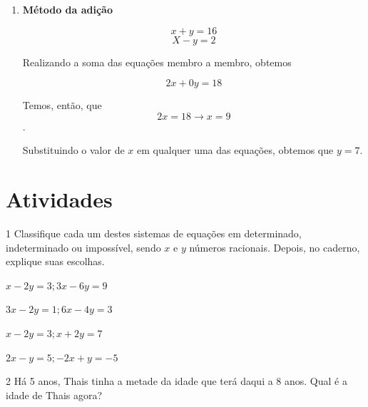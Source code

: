 {\begin{enumerate}
Agora, substituiremos o valor de $x$ na segunda equação:

II) $$2x + 3y = 10$$
    $$2 ( y -- 5) + 3y = 10$$
    $$2y - 10 + 3y = 10$$
    $$5y = 20$$
    $$y = 4$$

Como sabemos o valor de $y$, agora basta substituir o valor de $y$ em
qualquer uma das duas equações para obtermos $x = -1$.

\item \textbf{Método da adição}

$$x + y = 16$$
$$X - y = 2$$

Realizando a soma das equações membro a membro, obtemos

$$2x + 0y = 18$$

Temos, então, que $$2x = 18 \rightarrow x = 9$$.

Substituindo o valor de $x$ em qualquer uma das equações, obtemos que $y =
7$.
\end{enumerate}
}



\section*{Atividades}

\num{1} Classifique cada um destes sistemas de equações em determinado,
indeterminado ou impossível, sendo $x$ e $y$ números racionais.
Depois, no caderno, explique suas escolhas.

\begin{escolha}[itemsep=0pt]
\item $x - 2y = 3; 3x - 6y = 9$

\item $3x - 2y = 1; 6x - 4y = 3$

\item $x - 2y = 3; x + 2y = 7$

\item $2x - y = 5; -2x + y = -5$

\end{escolha}






\num{2} Há 5 anos, Thais tinha a metade da idade que terá daqui a 8 anos.
Qual é a idade de Thais agora?


